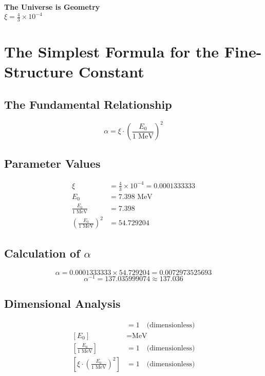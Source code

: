 \documentclass[12pt,a4paper]{article}
\theoremstyle{definition}
\begin{document}
	\begin{center}
		\Large
		\textbf{The Universe is Geometry}\\
		\vspace{1cm}
		\huge
		$\boxed{\xi = \frac{4}{3} \times 10^{-4}}$
	\end{center}
	
	\section*{The Simplest Formula for the Fine-Structure Constant}
	
	\subsection*{The Fundamental Relationship}
	
	\[
	\boxed{\alpha = \xi \cdot \left(\frac{E_0}{1 \text{ MeV}}\right)^2}
	\]
	
	\subsection*{Parameter Values}
	
	\begin{align*}
		\xi &= \frac{4}{3} \times 10^{-4} = 0.0001333333 \\
		E_0 &= 7.398 \text{ MeV} \\
		\frac{E_0}{1 \text{ MeV}} &= 7.398 \\
		\left(\frac{E_0}{1 \text{ MeV}}\right)^2 &= 54.729204
	\end{align*}
	
	\subsection*{Calculation of $\alpha$}
	
	\[
	\alpha = 0.0001333333 \times 54.729204 = 0.0072973525693
	\]
	\[
	\alpha^{-1} = 137.035999074 \approx 137.036
	\]
	
	\subsection*{Dimensional Analysis}
	
	\begin{align*}
		[\xi] &= 1 \quad \text{(dimensionless)} \\
		[E_0] &= \text{MeV} \\
		\left[\frac{E_0}{1 \text{ MeV}}\right] &= 1 \quad \text{(dimensionless)} \\
		\left[\xi \cdot \left(\frac{E_0}{1 \text{ MeV}}\right)^2\right] &= 1 \quad \text{(dimensionless)}
	\end{align*}
	
\end{document}
